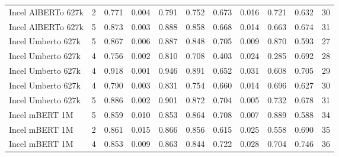 \begin{tabular}{lrrrrrrrrrr}
Incel AlBERTo 627k &      2 &                 0.771 &          0.004 &                  0.791 &                   0.752 &                 0.673 &           0.016 &                  0.721 &                   0.632 &  30 \\
Incel AlBERTo 627k &      5 &                 0.873 &          0.003 &                  0.888 &                   0.858 &                 0.668 &           0.014 &                  0.663 &                   0.674 &  31 \\
Incel Umberto 627k &      5 &                 0.867 &          0.006 &                  0.887 &                   0.848 &                 0.705 &           0.009 &                  0.870 &                   0.593 &  27 \\
Incel Umberto 627k &      4 &                 0.756 &          0.002 &                  0.810 &                   0.708 &                 0.403 &           0.024 &                  0.285 &                   0.692 &  28 \\
Incel Umberto 627k &      4 &                 0.918 &          0.001 &                  0.946 &                   0.891 &                 0.652 &           0.031 &                  0.608 &                   0.705 &  29 \\
Incel Umberto 627k &      4 &                 0.790 &          0.003 &                  0.831 &                   0.754 &                 0.660 &           0.014 &                  0.696 &                   0.627 &  30 \\
Incel Umberto 627k &      5 &                 0.886 &          0.002 &                  0.901 &                   0.872 &                 0.704 &           0.005 &                  0.732 &                   0.678 &  31 \\
    Incel mBERT 1M &      5 &                 0.859 &          0.010 &                  0.853 &                   0.864 &                 0.708 &           0.007 &                  0.889 &                   0.588 &  34 \\
    Incel mBERT 1M &      2 &                 0.861 &          0.015 &                  0.866 &                   0.856 &                 0.615 &           0.025 &                  0.558 &                   0.690 &  35 \\
    Incel mBERT 1M &      4 &                 0.853 &          0.009 &                  0.863 &                   0.844 &                 0.722 &           0.028 &                  0.704 &                   0.746 &  36 \\

\end{tabular}
